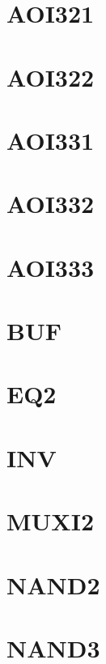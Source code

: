 \documentclass[10pt,a4paper,twoside]{article}
\begin{document}
\section{AOI321}

\clearpage

\section{AOI322}

\clearpage

\section{AOI331}

\clearpage

\section{AOI332}

\clearpage

\section{AOI333}

\clearpage

\section{BUF}

\clearpage

\section{EQ2}

\clearpage

\section{INV}

\clearpage

\section{MUXI2}

\clearpage

\section{NAND2}

\clearpage

\section{NAND3}

\clearpage
\end{document}
